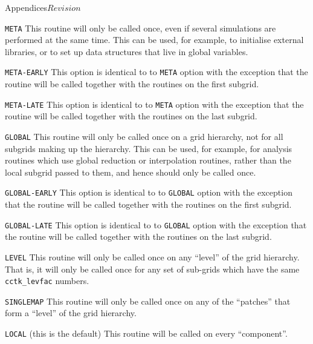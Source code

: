 \begin{cactuspart}{Appendices}{}{$Revision$}
\begin{Lentry}
  
\item[{\tt META}] This routine will only be called once, even if
  several simulations are performed at the same time.  This can be
  used, for example, to initialise external libraries, or to set up
  data structures that live in global variables.
  
\item[{\tt META-EARLY}] This option is identical to to {\tt META}
  option with the exception that the routine will be called together
  with the routines on the first subgrid.
  
\item[{\tt META-LATE}] This option is identical to to {\tt META}
  option with the exception that the routine will be called together
  with the routines on the last subgrid.
  
\item[{\tt GLOBAL}] This routine will only be called once on a grid
  hierarchy, not for all subgrids making up the hierarchy.  This can
  be used, for example, for analysis routines which use global
  reduction or interpolation routines, rather than the local subgrid
  passed to them, and hence should only be called once.
  
\item[{\tt GLOBAL-EARLY}] This option is identical to to {\tt GLOBAL}
  option with the exception that the routine will be called together
  with the routines on the first subgrid.
  
\item[{\tt GLOBAL-LATE}] This option is identical to to {\tt GLOBAL}
  option with the exception that the routine will be called together
  with the routines on the last subgrid.
  
\item[{\tt LEVEL}] This routine will only be called once on any
  ``level'' of the grid hierarchy.  That is, it will only be called
  once for any set of sub-grids which have the same
  \texttt{cctk\_levfac} numbers.
  
\item[{\tt SINGLEMAP}] This routine will only be called once on any of
  the ``patches'' that form a ``level'' of the grid hierarchy.
  
\item[{\tt LOCAL} (this is the default)] This routine will be called
  on every ``component''.

\end{Lentry}


\end{cactuspart}
